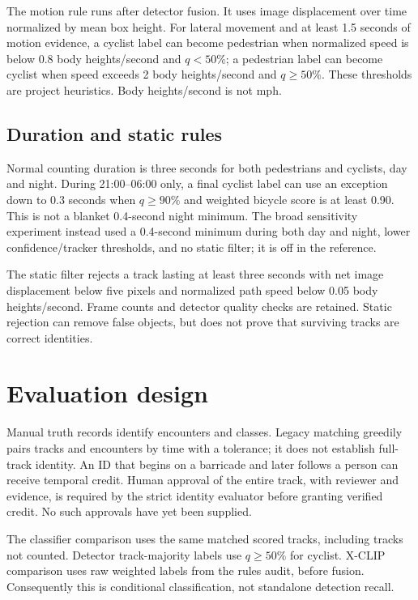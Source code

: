 \documentclass[11pt,letterpaper]{article}
\begin{document}
The motion rule runs after detector fusion. It uses image displacement over time normalized by mean box height. For lateral movement and at least 1.5 seconds of motion evidence, a cyclist label can become pedestrian when normalized speed is below 0.8 body heights/second and $q<50\%$; a pedestrian label can become cyclist when speed exceeds 2 body heights/second and $q\ge50\%$. These thresholds are project heuristics. Body heights/second is not mph.

\subsection{Duration and static rules}
Normal counting duration is three seconds for both pedestrians and cyclists, day and night. During 21:00--06:00 only, a final cyclist label can use an exception down to 0.3 seconds when $q\ge90\%$ and weighted bicycle score is at least 0.90. This is not a blanket 0.4-second night minimum. The broad sensitivity experiment instead used a 0.4-second minimum during both day and night, lower confidence/tracker thresholds, and no static filter; it is off in the reference.

The static filter rejects a track lasting at least three seconds with net image displacement below five pixels and normalized path speed below 0.05 body heights/second. Frame counts and detector quality checks are retained. Static rejection can remove false objects, but does not prove that surviving tracks are correct identities.

\section{Evaluation design}
Manual truth records identify encounters and classes. Legacy matching greedily pairs tracks and encounters by time with a tolerance; it does not establish full-track identity. An ID that begins on a barricade and later follows a person can receive temporal credit. Human approval of the entire track, with reviewer and evidence, is required by the strict identity evaluator before granting verified credit. No such approvals have yet been supplied.

The classifier comparison uses the same matched scored tracks, including tracks not counted. Detector track-majority labels use $q\ge50\%$ for cyclist. X-CLIP comparison uses raw weighted labels from the rules audit, before fusion. Consequently this is conditional classification, not standalone detection recall.
\end{document}
